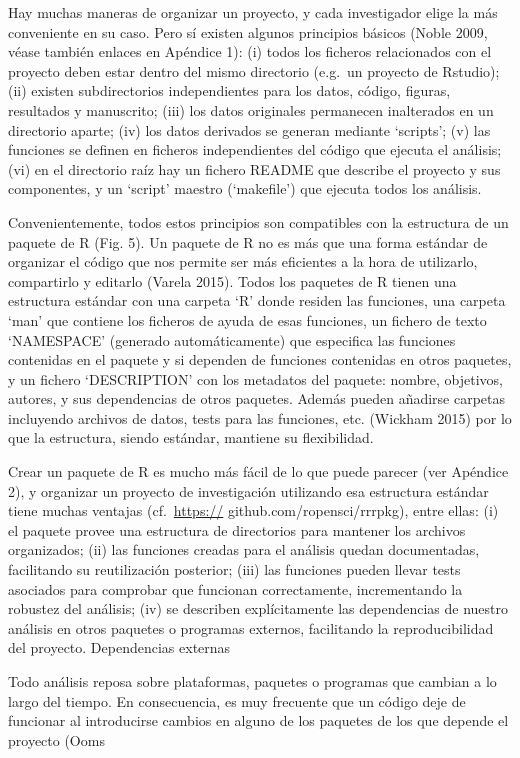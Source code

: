 \documentclass[]{tufte-handout}
\begin{document}
Hay muchas maneras de organizar un proyecto, y cada investigador elige
la más conveniente en su caso. Pero sí existen algunos principios
básicos (Noble 2009, véase también enlaces en Apéndice 1): (i) todos los
ficheros relacionados con el proyecto deben estar dentro del mismo
directorio (e.g.~un proyecto de Rstudio); (ii) existen subdirectorios
independientes para los datos, código, figuras, resultados y manuscrito;
(iii) los datos originales permanecen inalterados en un directorio
aparte; (iv) los datos derivados se generan mediante `scripts'; (v) las
funciones se definen en ficheros independientes del código que ejecuta
el análisis; (vi) en el directorio raíz hay un fichero README que
describe el proyecto y sus componentes, y un `script' maestro
(`makefile') que ejecuta todos los análisis.

Convenientemente, todos estos principios son compatibles con la
estructura de un paquete de R (Fig. 5). Un paquete de R no es más que
una forma estándar de organizar el código que nos permite ser más
eficientes a la hora de utilizarlo, compartirlo y editarlo (Varela
2015). Todos los paquetes de R tienen una estructura estándar con una
carpeta `R' donde residen las funciones, una carpeta `man' que contiene
los ficheros de ayuda de esas funciones, un fichero de texto `NAMESPACE'
(generado automáticamente) que especifica las funciones contenidas en el
paquete y si dependen de funciones contenidas en otros paquetes, y un
fichero `DESCRIPTION' con los metadatos del paquete: nombre, objetivos,
autores, y sus dependencias de otros paquetes. Además pueden añadirse
carpetas incluyendo archivos de datos, tests para las funciones, etc.
(Wickham 2015) por lo que la estructura, siendo estándar, mantiene su
flexibilidad.

Crear un paquete de R es mucho más fácil de lo que puede parecer (ver
Apéndice 2), y organizar un proyecto de investigación utilizando esa
estructura estándar tiene muchas ventajas (cf.~\url{https://}
github.com/ropensci/rrrpkg), entre ellas: (i) el paquete provee una
estructura de directorios para mantener los archivos organizados; (ii)
las funciones creadas para el análisis quedan documentadas, facilitando
su reutilización posterior; (iii) las funciones pueden llevar tests
asociados para comprobar que funcionan correctamente, incrementando la
robustez del análisis; (iv) se describen explícitamente las dependencias
de nuestro análisis en otros paquetes o programas externos, facilitando
la reproducibilidad del proyecto. Dependencias externas

Todo análisis reposa sobre plataformas, paquetes o programas que cambian
a lo largo del tiempo. En consecuencia, es muy frecuente que un código
deje de funcionar al introducirse cambios en alguno de los paquetes de
los que depende el proyecto (Ooms
\end{document}

